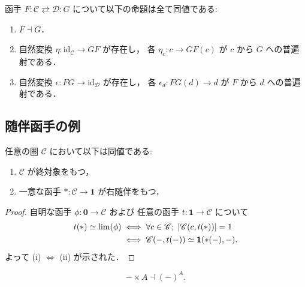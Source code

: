 \documentclass[titlepage]{ltjsreport}
\newcommand{\cat}[1]{\mathscr{#1}}
\newcommand{\obj}[1]{\lowercase{#1}}
\newcommand{\objs}[1]{#1}
\newcommand{\mrp}[3]{{#1}:{#2}\to{#3}}
\newcommand{\mrps}[3]{#1(#2,#3)}
\newcommand{\id}[1]{\mathrm{id}_{#1}}
\begin{document}
\begin{theorem}[随伴函手の並列定義]\label{thm:adjoint-functor-definitions}
  函手 $F:\cat{C}\rightleftarrows\cat{D}:G$ について以下の命題は全て同値である:
  \begin{enumerate}
    \item $F\dashv G$．
    \item 自然変換 $\eta:\id{\cat{C}}\to GF$ が存在し，
          各 $\eta_c:c\to GF(c)$ が $c$ から $G$ への普遍射である．
    \item 自然変換 $\epsilon:FG\to\id{\cat{D}}$ が存在し，
          各 $\epsilon_d:FG(d)\to d$ が $F$ から $d$ への普遍射である．
  \end{enumerate}
\end{theorem}

\subsection{随伴函手の例}

{
  \def\C{\cat{C}}%
  \begin{theorem}[終対象]
    任意の圏 $\C$ において以下は同値である:
    \begin{enumerate}[label=(\roman*)] %
      \item $\C$ が終対象をもつ，
      \item 一意な函手 $*:\C\to\mathbf{1}$ が右随伴をもつ．
    \end{enumerate}
  \end{theorem}
  \begin{proof}
    \def\c{\obj{c}}%
    自明な函手 $\mrp{\phi}{\mathbf{0}}{\C}$ および
    任意の函手 $t:\mathbf{1}\to\C$ について
    \begin{align} %
      t(*)\simeq\lim(\phi)
       & \iff\forall\c\in\objs{\C};
      \ |\mrps{\C}{c}{t(*)}|=1                                   \\
       & \iff\mrps{\C}{-}{t(-)}\simeq\mrps{\mathbf{1}}{*(-)}{-}.
    \end{align}
    よって (i) $\Leftrightarrow$ (ii) が示された．
  \end{proof}
}

\begin{theorem}[積函手と冪函手]
  \begin{equation}
    -\times A\dashv{(-)}^A.
  \end{equation}
\end{theorem}
\end{document}
